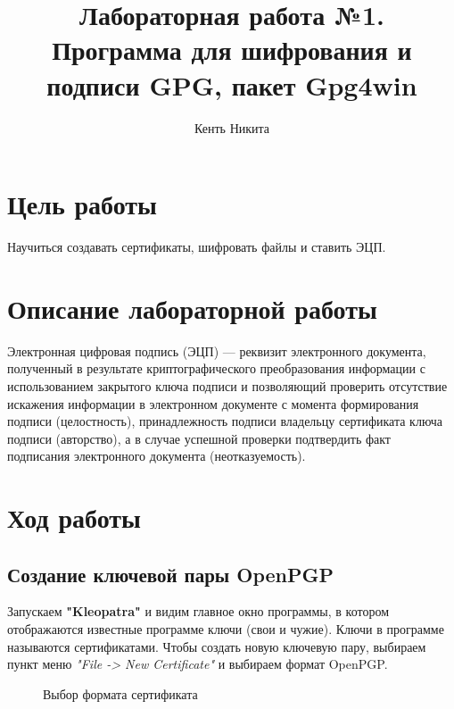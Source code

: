 \documentclass[10pt,a4paper]{report}
\author{Кенть Никита}
\title{Лабораторная работа №1.\\
	Программа для шифрования и подписи GPG, пакет Gpg4win}
\begin{document}
	\maketitle
	\tableofcontents
	\pagebreak
	
	\chapter{Цель работы}
	Научиться создавать сертификаты, шифровать файлы и ставить ЭЦП.
	\chapter{Описание лабораторной работы}
	Электронная цифровая подпись (ЭЦП) — реквизит электронного документа, полученный в результате криптографического преобразования информации с использованием закрытого ключа подписи и позволяющий проверить отсутствие искажения информации в электронном документе с момента формирования подписи (целостность), принадлежность подписи владельцу сертификата ключа подписи (авторство), а в случае успешной проверки подтвердить факт подписания электронного документа (неотказуемость).
	
	\chapter{Ход работы}
	\section{Создание ключевой пары OpenPGP}
	Запускаем \textbf{"Kleopatra"} и видим главное окно программы, в котором отображаются известные программе ключи (свои и чужие). Ключи в программе называются сертификатами. Чтобы создать новую ключевую пару, выбираем пункт меню \textit{"File -> New Certificate"} и выбираем формат OpenPGP. 
	
\begin{figure}[ht]	
	\caption{Выбор формата сертификата}
	\label{pic:pic0}
\end{figure} 
\end{document}
